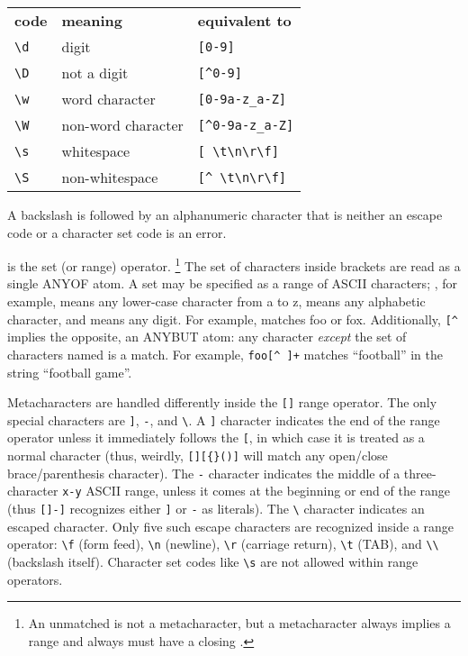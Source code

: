 \begin{center}
\begin{tabular}{lll} 
\textbf{code} & \textbf{meaning}    & \textbf{equivalent to} \\
 \verb+\d+    & digit               & \verb+[0-9]+ \\
 \verb+\D+    & not a digit         & \verb+[^0-9]+ \\
 \verb+\w+    & word character      & \verb+[0-9a-z_a-Z]+ \\
 \verb+\W+    & non-word character  & \verb+[^0-9a-z_a-Z]+ \\
 \verb+\s+    & whitespace          & \verb+[ \t\n\r\f]+ \\
 \verb+\S+    & non-whitespace      & \verb+[^ \t\n\r\f]+ \\
\end{tabular}
\end{center}

A backslash is followed by an alphanumeric character that is neither
an escape code or a character set code is an error.

\ccode{[} is the set (or range) operator. \footnote{An unmatched
\ccode{]} is not a metacharacter, but a \ccode{[} metacharacter always
implies a range and always must have a closing \ccode{]}.} The set of
characters inside brackets \ccode{[]} are read as a single ANYOF
atom. A set may be specified as a range of ASCII characters;
\ccode{[a-z]}, for example, means any lower-case character from a to
z, \ccode{[a-zA-Z]} means any alphabetic character, and \ccode{[0-9]}
means any digit. For example,  matches foo or
fox. Additionally, \verb+[^+ implies the opposite, an ANYBUT atom: any
character \emph{except} the set of characters named is a match. For
example, \verb'foo[^ ]+' matches ``football'' in the string ``football
game''. 

Metacharacters are handled differently inside the \verb+[]+ range
operator. The only special characters are \verb+]+, \verb+-+, and
\verb+\+. A \verb+]+ character indicates the end of the range operator
unless it immediately follows the \verb+[+, in which case it is
treated as a normal character (thus, weirdly, \verb+[][{}()]+ will
match any open/close brace/parenthesis character). The \verb+-+
character indicates the middle of a three-character \verb+x-y+ ASCII
range, unless it comes at the beginning or end of the range (thus
\verb+[]-]+ recognizes either \verb+]+ or \verb+-+ as literals).  The
\verb+\+ character indicates an escaped character. Only five such
escape characters are recognized inside a range operator: \verb+\f+
(form feed), \verb+\n+ (newline), \verb+\r+ (carriage return),
\verb+\t+ (TAB), and \verb+\\+ (backslash itself). Character set codes
like \verb+\s+ are not allowed within range operators.








